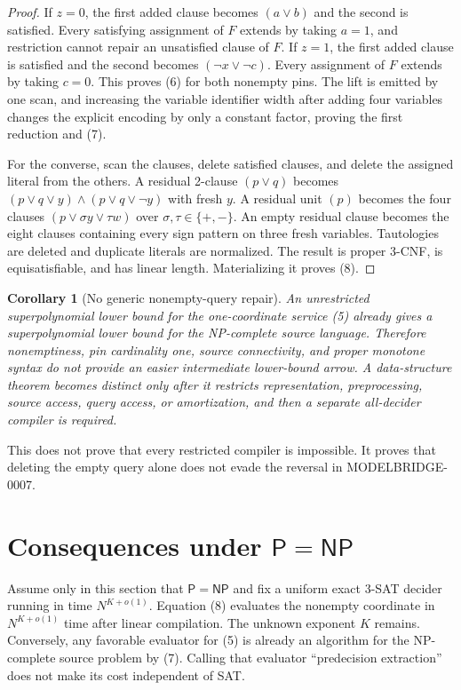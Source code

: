 \documentclass[11pt]{article}
\newtheorem{corollary}[theorem]{Corollary}
\begin{document}
\begin{proof}
If $z=0$, the first added clause becomes $(a\vee b)$ and the second is
satisfied.  Every satisfying assignment of $F$ extends by taking $a=1$, and
restriction cannot repair an unsatisfied clause of $F$.  If $z=1$, the first
added clause is satisfied and the second becomes $(\neg x\vee\neg c)$.
Every assignment of $F$ extends by taking $c=0$.  This proves (6) for both
nonempty pins.  The lift is emitted by one scan, and increasing the variable
identifier width after adding four variables changes the explicit encoding
by only a constant factor, proving the first reduction and (7).

For the converse, scan the clauses, delete satisfied clauses, and delete the
assigned literal from the others.  A residual 2-clause $(p\vee q)$ becomes
$(p\vee q\vee y)\wedge(p\vee q\vee\neg y)$ with fresh $y$.  A residual unit
$(p)$ becomes the four clauses $(p\vee\sigma y\vee\tau w)$ over
$\sigma,\tau\in\{+,-\}$.  An empty residual clause becomes the eight clauses
containing every sign pattern on three fresh variables.  Tautologies are
deleted and duplicate literals are normalized.  The result is proper 3-CNF,
is equisatisfiable, and has linear length.  Materializing it proves (8).
\end{proof}

\begin{corollary}[No generic nonempty-query repair]
An unrestricted superpolynomial lower bound for the one-coordinate service
(5) already gives a superpolynomial lower bound for the NP-complete source
language.  Therefore nonemptiness, pin cardinality one, source connectivity,
and proper monotone syntax do not provide an easier intermediate lower-bound
arrow.  A data-structure theorem becomes distinct only after it restricts
representation, preprocessing, source access, query access, or amortization,
and then a separate all-decider compiler is required.
\end{corollary}

This does not prove that every restricted compiler is impossible.  It proves
that deleting the empty query alone does not evade the reversal in
MODELBRIDGE-0007.

\section{Consequences under $\mathsf P=\mathsf{NP}$}

Assume only in this section that $\mathsf P=\mathsf{NP}$ and fix a uniform
exact 3-SAT decider running in time $N^{K+o(1)}$.  Equation (8) evaluates the
nonempty coordinate in $N^{K+o(1)}$ time after linear compilation.  The
unknown exponent $K$ remains.  Conversely, any favorable evaluator for (5)
is already an algorithm for the NP-complete source problem by (7).  Calling
that evaluator ``predecision extraction'' does not make its cost independent
of SAT.
\end{document}
